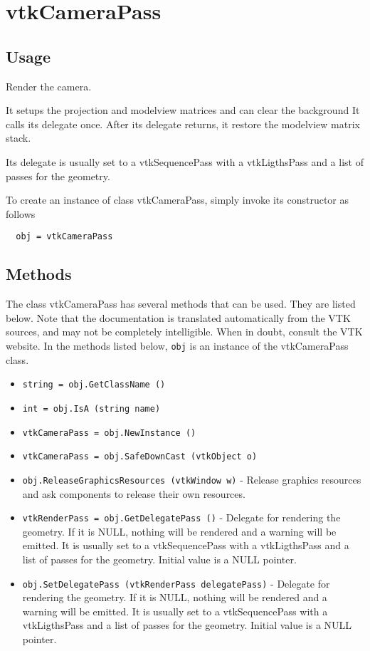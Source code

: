 \section{vtkCameraPass}

\subsection{Usage}

 Render the camera.

 It setups the projection and modelview matrices and can clear the background
 It calls its delegate once.
 After its delegate returns, it restore the modelview matrix stack.

 Its delegate is usually set to a vtkSequencePass with a vtkLigthsPass and
 a list of passes for the geometry.
 

To create an instance of class vtkCameraPass, simply
invoke its constructor as follows
\begin{verbatim}
  obj = vtkCameraPass
\end{verbatim}
\subsection{Methods}

The class vtkCameraPass has several methods that can be used.
  They are listed below.
Note that the documentation is translated automatically from the VTK sources,
and may not be completely intelligible.  When in doubt, consult the VTK website.
In the methods listed below, \verb|obj| is an instance of the vtkCameraPass class.
\begin{itemize}
\item  \verb|string = obj.GetClassName ()|

\item  \verb|int = obj.IsA (string name)|

\item  \verb|vtkCameraPass = obj.NewInstance ()|

\item  \verb|vtkCameraPass = obj.SafeDownCast (vtkObject o)|

\item  \verb|obj.ReleaseGraphicsResources (vtkWindow w)| -  Release graphics resources and ask components to release their own
 resources.
 

\item  \verb|vtkRenderPass = obj.GetDelegatePass ()| -  Delegate for rendering the geometry.
 If it is NULL, nothing will be rendered and a warning will be emitted.
 It is usually set to a vtkSequencePass with a vtkLigthsPass and
 a list of passes for the geometry.
 Initial value is a NULL pointer.

\item  \verb|obj.SetDelegatePass (vtkRenderPass delegatePass)| -  Delegate for rendering the geometry.
 If it is NULL, nothing will be rendered and a warning will be emitted.
 It is usually set to a vtkSequencePass with a vtkLigthsPass and
 a list of passes for the geometry.
 Initial value is a NULL pointer.

\end{itemize}
